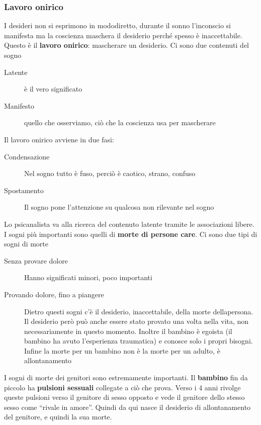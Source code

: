 \subsubsection{Lavoro onirico}
I desideri non si esprimono in mododiretto, durante il sonno l'inconscio si manifesta ma la coscienza
maschera il desiderio perché spesso è inaccettabile. Questo è il \textbf{lavoro onirico}: mascherare
un desiderio. Ci sono due contenuti del sogno
\begin{description}
  \item[Latente] è il vero significato
  \item[Manifesto] quello che osserviamo, ciò che la coscienza usa per mascherare
\end{description} 
Il lavoro onirico avviene in due fasi:
\begin{description}
  \item[Condensazione] Nel sogno tutto è fuso, perciò è caotico, strano, confuso
  \item[Spostamento] Il sogno pone l'attenzione su qualcosa non rilevante nel sogno
\end{description}
Lo psicanalista va alla ricerca del contenuto latente tramite le associazioni libere.\\
[\baselineskip]
I sogni più importanti sono quelli di \textbf{morte di persone care}. Ci sono due tipi di sogni di
morte
\begin{description}
  \item[Senza provare dolore] Hanno significati minori, poco importanti
  \item[Provando dolore, fino a piangere] Dietro questi sogni c'è il desiderio, inaccettabile, della
    morte dellapersona. Il desiderio però può anche essere stato provato una volta nella vita,
    non necessariamente in questo momento. Inoltre il bambino è egoista (il bambino ha avuto 
    l'esperienza traumatica) e conosce solo i propri bisogni. Infine la morte per un bambino non è
    la morte per un adulto, è allontanamento
\end{description}
I sogni di morte dei genitori sono estremamente importanti. Il \textbf{bambino} fin da piccolo ha
\textbf{pulsioni sessuali} collegate a ciò che prova. Verso i 4 anni rivolge queste pulsioni verso
il genitore di sesso opposto e vede il genitore dello stesso sesso come ``rivale in amore''. Quindi
da qui nasce il desiderio di allontanamento del genitore, e quindi la sua morte.

